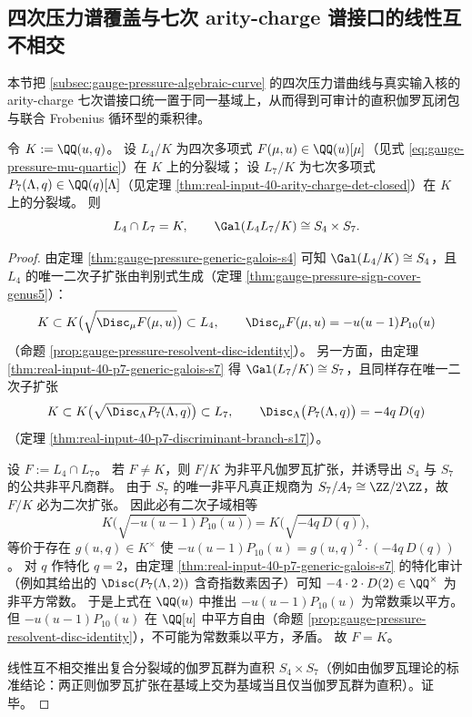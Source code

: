 \subsection{四次压力谱覆盖与七次 arity-charge 谱接口的线性互不相交}\label{subsec:root-unit-s4xs7-linearly-disjoint}

本节把 \ref{subsec:gauge-pressure-algebraic-curve} 的四次压力谱曲线与真实输入核的 arity-charge 七次谱接口统一置于同一基域上，从而得到可审计的直积伽罗瓦闭包与联合 Frobenius 循环型的乘积律。

\begin{theorem}[四次压力谱与七次谱接口的线性互不相交]\label{thm:root-unit-s4xs7-linearly-disjoint}
令 \(K:=\QQ(u,q)\)。
设 \(L_4/K\) 为四次多项式 \(F(\mu,u)\in\QQ(u)[\mu]\)（见式 \eqref{eq:gauge-pressure-mu-quartic}）在 \(K\) 上的分裂域；
设 \(L_7/K\) 为七次多项式 \(P_7(\Lambda,q)\in\QQ(q)[\Lambda]\)（见定理 \ref{thm:real-input-40-arity-charge-det-closed}）在 \(K\) 上的分裂域。
则
\[
L_4\cap L_7=K,
\qquad
\Gal(L_4L_7/K)\cong S_4\times S_7.
\]
\end{theorem}

\begin{proof}
由定理 \ref{thm:gauge-pressure-generic-galois-s4} 可知 \(\Gal(L_4/K)\cong S_4\)，且 \(L_4\) 的唯一二次子扩张由判别式生成（定理 \ref{thm:gauge-pressure-sign-cover-genus5}）：
\[
K\subset K\bigl(\sqrt{\Disc_{\mu}F(\mu,u)}\bigr)\subset L_4,
\qquad
\Disc_{\mu}F(\mu,u)=-u(u-1)P_{10}(u)
\]
（命题 \ref{prop:gauge-pressure-resolvent-disc-identity}）。
另一方面，由定理 \ref{thm:real-input-40-p7-generic-galois-s7} 得 \(\Gal(L_7/K)\cong S_7\)，且同样存在唯一二次子扩张
\[
K\subset K\bigl(\sqrt{\Disc_{\Lambda}P_7(\Lambda,q)}\bigr)\subset L_7,
\qquad
\Disc_{\Lambda}\bigl(P_7(\Lambda,q)\bigr)=-4q\,D(q)
\]
（定理 \ref{thm:real-input-40-p7-discriminant-branch-s17}）。
\par
设 \(F:=L_4\cap L_7\)。
若 \(F\neq K\)，则 \(F/K\) 为非平凡伽罗瓦扩张，并诱导出 \(S_4\) 与 \(S_7\) 的公共非平凡商群。
由于 \(S_7\) 的唯一非平凡真正规商为 \(S_7/A_7\cong \ZZ/2\ZZ\)，故 \(F/K\) 必为二次扩张。
因此必有二次子域相等
\[
K\bigl(\sqrt{-u(u-1)P_{10}(u)}\bigr)=K\bigl(\sqrt{-4q\,D(q)}\bigr),
\]
等价于存在 \(g(u,q)\in K^\times\) 使
\(
-u(u-1)P_{10}(u)=g(u,q)^2\cdot(-4q\,D(q))
\)。
对 \(q\) 作特化 \(q=2\)，由定理 \ref{thm:real-input-40-p7-generic-galois-s7} 的特化审计（例如其给出的 \(\Disc(P_7(\Lambda,2))\) 含奇指数素因子）可知 \(-4\cdot 2\cdot D(2)\in\QQ^\times\) 为非平方常数。
于是上式在 \(\QQ(u)\) 中推出 \(-u(u-1)P_{10}(u)\) 为常数乘以平方。
但 \(-u(u-1)P_{10}(u)\) 在 \(\QQ[u]\) 中平方自由（命题 \ref{prop:gauge-pressure-resolvent-disc-identity}），不可能为常数乘以平方，矛盾。
故 \(F=K\)。
\par
线性互不相交推出复合分裂域的伽罗瓦群为直积 \(S_4\times S_7\)（例如由伽罗瓦理论的标准结论：两正则伽罗瓦扩张在基域上交为基域当且仅当伽罗瓦群为直积）。证毕。
\end{proof}

